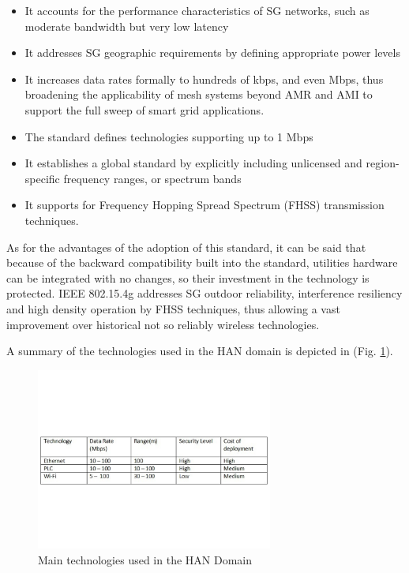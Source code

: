 \documentclass[11pt,draftclsnofoot,onecolumn]{IEEEtran}
\begin{document}
\begin{itemize}
	\item It accounts for the performance characteristics of SG networks, such as moderate bandwidth but very low latency
	\item It addresses SG geographic requirements by defining appropriate power levels
	\item It increases data rates formally to hundreds of kbps, and even Mbps, thus broadening the applicability of mesh systems beyond AMR and AMI to support the full sweep of smart grid applications. 
	\item The standard defines technologies supporting up to 1 Mbps
	\item It establishes a global standard by explicitly including unlicensed and region-specific frequency ranges, or spectrum bands
	\item It supports for Frequency Hopping Spread Spectrum (FHSS) transmission techniques.

\end{itemize}

As for the advantages of the adoption of this standard, it can be said that because of the backward compatibility built into the standard, utilities hardware can be integrated with no changes, so their investment in the technology is protected. IEEE 802.15.4g addresses SG outdoor reliability, interference resiliency and high density operation by FHSS techniques, thus allowing a vast improvement over historical not so reliably wireless technologies.

A summary of the technologies used in the HAN domain is depicted in  (Fig. \ref{fig:han}).

\begin{figure}[h!]
\centering
\includegraphics [height=6cm] {HANTechnologies}
\caption{Main technologies used in the HAN Domain}
\label{fig:han}
\end{figure}
\end{document}

